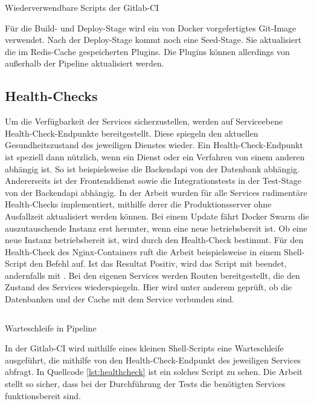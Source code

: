\begin{listing}
    \inputminted{yaml}{snippets/yml/reusable_scripts.yml}
    \caption{Wiederverwendbare Scripts der Gitlab-CI}
    \label{lst:wiederverwendbarescriptsdergitlabci}
\end{listing}

Für die Build- und Deploy-Stage wird ein von Docker vorgefertigtes Git-Image verwendet. Nach der Deploy-Stage
kommt noch eine Seed-Stage. Sie aktualisiert die im Redis-Cache gespeicherten Plugins. Die Plugins können
allerdings von außerhalb der Pipeline aktualisiert werden.

\subsection{Health-Checks}
\label{subsec:healthcheck}
Um die Verfügbarkeit der Services sicherzustellen, werden auf
Serviceebene Health-Check-Endpunkte bereitgestellt. Diese spiegeln den aktuellen
Gesundheitszustand des jeweiligen Dienstes wieder. Ein Health-Check-Endpunkt
ist speziell dann nützlich, wenn ein Dienst oder ein Verfahren von einem anderen
abhängig ist. So ist beispielsweise die Backendapi von der Datenbank
abhängig. Andererseits ist der Frontenddienst sowie die Integrationstests
in der Test-Stage von der Backendapi abhängig. In der Arbeit wurden für alle Services
rudimentäre Health-Checks implementiert, mithilfe derer die Produktionsserver ohne Ausfallzeit
aktualisiert werden können. Bei einem Update fährt Docker Swarm die auszutauschende
Instanz erst herunter, wenn eine neue betriebsbereit ist. Ob eine neue Instanz betriebsbereit ist,
wird durch den Health-Check bestimmt. Für den Health-Check des Nginx-Containers ruft die Arbeit beispielsweise
in einem Shell-Script den Befehl  auf. Ist das Resultat Positiv, wird
das Script mit  beendet, andernfalls mit . Bei den eigenen Services werden 
Routen bereitgestellt, die den Zustand des Services wiederspiegeln. Hier wird unter anderem geprüft, ob die Datenbanken
und der Cache mit dem Service verbunden sind.

\begin{listing}
    \inputminted{sh}{snippets/sh/healthcheck.sh}
    \caption{Warteschleife in Pipeline}
    \label{lst:healthcheck}
\end{listing}

In der Gitlab-CI wird mithilfe eines kleinen Shell-Scripts eine Warteschleife ausgeführt, die mithilfe von
 den Health-Check-Endpunkt des jeweiligen Services abfragt. In Quellcode \ref{lst:healthcheck}
ist ein solches Script zu sehen. Die Arbeit stellt so sicher, dass bei der Durchführung der Tests die
benötigten Services funktionsbereit sind.

